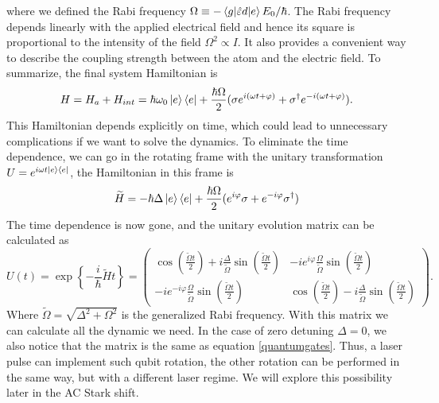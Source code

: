  where we defined the Rabi frequency $\Omega \equiv - \braket{g|\hat{\varepsilon} d|e}E_0/\hbar$. The Rabi frequency depends linearly with the applied electrical field and hence its square is proportional to the intensity of the field $\Omega ^2 \propto I$. It also provides a convenient way to describe the coupling strength between the atom and the electric field. To summarize, the final system Hamiltonian is
 \begin{equation}
 \label{2levelatomhamiltonian}
H = H_a + H_{int} = \hbar\omega_0 \ket{e}\bra{e} + \frac{\hbar \Omega}{2}(\sigma e^{i(\omega t+\varphi)} + \sigma^\dagger e^{-i(\omega t+\varphi)}).
 \end{equation}
This Hamiltonian depends explicitly on time, which could lead to unnecessary complications if we want to solve the dynamics. To eliminate the time dependence, we can go in the rotating frame with the unitary transformation $U = e^{i\omega t \ket{e}\bra{e}}$, the Hamiltonian in this frame is
\begin{equation}
\label{Hamiltonianrotatingframe}
\widetilde{H} = -\hbar \Delta \ket{e}\bra{e} + \frac{\hbar \Omega}{2}(e^{i\varphi}\sigma + e^{-i\varphi}\sigma^\dagger)
\end{equation}
The time dependence is now gone, and the unitary evolution matrix can be calculated as
\begin{equation}
\label{laserpulse}
U(t) = \exp\left\{-\frac{i}{\hbar} \widetilde{H} t \right\} =
 \begin{pmatrix}
  \cos\left(\frac{\widetilde{\Omega} t}{2}\right) + i \frac{\Delta}{\widetilde{\Omega}} \sin\left(\frac{\widetilde{\Omega} t}{2}\right) & -ie^{i\varphi}\frac{\Omega}{\widetilde{\Omega}}  \sin\left(\frac{\widetilde{\Omega} t}{2}\right) \\
  -ie^{-i\varphi}\frac{\Omega}{\widetilde{\Omega}}  \sin\left(\frac{\widetilde{\Omega} t}{2}\right)  & \cos\left(\frac{\widetilde{\Omega} t}{2}\right) - i \frac{\Delta}{\widetilde{\Omega}} \sin\left(\frac{\widetilde{\Omega} t}{2}\right)
\end{pmatrix}.
\end{equation}
Where $\widetilde{\Omega} = \sqrt{\Delta^2 + \Omega^2}$ is the generalized Rabi frequency. With this matrix we can calculate all the dynamic we need. In the case of zero detuning $\Delta = 0$, we also notice that the matrix is the same as equation \eqref{quantumgates}. Thus, a laser pulse can implement such qubit rotation, the other rotation can be performed in the same way, but with a different laser regime. We will explore this possibility later in the AC Stark shift.\\
